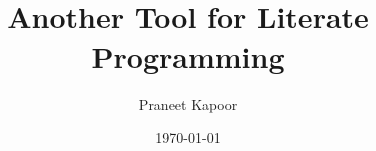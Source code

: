 \documentclass[10pt]{report}
\begin{document}
\title{%
        \litcode\\
        \vspace{0.2cm}
        \large Another Tool for Literate Programming
        }
\author{Praneet Kapoor}
\date{\today}
\maketitle

\tableofcontents









\newpage
\lstlistoflistings
\end{document}
